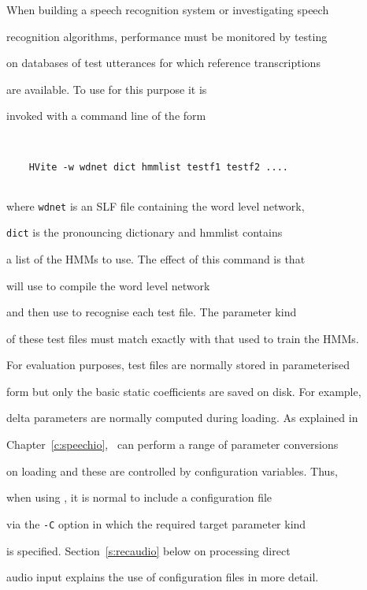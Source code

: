 




When building a speech recognition system or investigating speech


recognition algorithms, performance must be monitored by testing


on databases of test utterances for which reference transcriptions


are available.  To use  for this purpose it is


invoked with a command line of the form


\begin{verbatim}


    HVite -w wdnet dict hmmlist testf1 testf2 ....


\end{verbatim}


where \texttt{wdnet} is an SLF file containing the word level network, 


\texttt{dict} is the pronouncing dictionary and hmmlist contains


a list of the HMMs to use.  The effect of this command is that


 will use  to compile the word level network


and then use  to recognise each test file.   The parameter kind


of these test files must match exactly with that used to train the HMMs.


For evaluation purposes, test files are normally stored in parameterised


form but only the basic static coefficients are saved on disk.  For example,


delta parameters are normally computed during loading.  As explained in


Chapter~\ref{c:speechio}, \HTK\ can perform a range of parameter conversions


on loading and these are controlled by configuration variables.  Thus,


when using , it is normal to include a configuration file


via the \texttt{-C} option in which the required target parameter kind 


is specified.  Section~\ref{s:recaudio} below on processing direct


audio input explains the use of configuration files in more detail.


